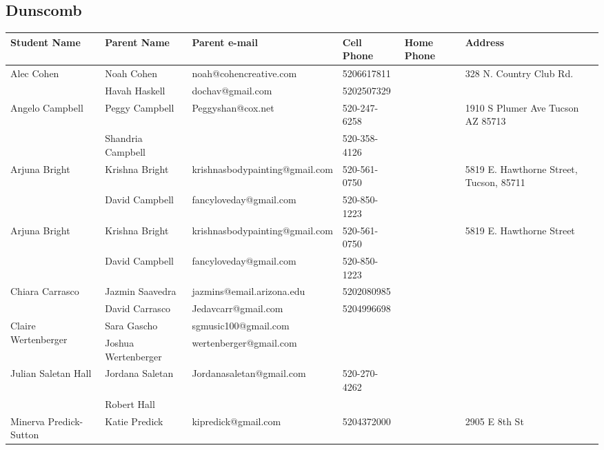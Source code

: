 \documentclass[landscape]{article}\usepackage[]{graphicx}\usepackage[]{color}
\begin{document}
\subsection{Dunscomb}
\begin{longtable}{|p{100pt}|p{100pt}|p{140pt}|p{60pt}|p{64pt}|p{120pt}|}
\textbf{Student Name} & \textbf{Parent Name} & \textbf{Parent e-mail} & \textbf{Cell Phone} & \textbf{Home Phone} & \textbf{Address}\\
\hline
\hline
\multirow{2}{100pt}{Alec Cohen} & Noah Cohen & noah@cohencreative.com & 5206617811 &  & \multirow{2}{120pt}{328 N. Country Club Rd.} \\
 & Havah Haskell & dochav@gmail.com & 5202507329 &  & \\
\hline
\multirow{2}{100pt}{Angelo Campbell } & Peggy Campbell  & Peggyshan@cox.net & 520-247-6258 &  & \multirow{2}{120pt}{1910 S Plumer Ave Tucson AZ 85713} \\
 & Shandria Campbell  &  & 520-358-4126 &  & \\
\hline
\multirow{2}{100pt}{Arjuna Bright} & Krishna Bright & krishnasbodypainting@gmail.com & 520-561-0750 &  & \multirow{2}{120pt}{5819 E. Hawthorne Street, Tucson, 85711} \\
 & David Campbell & fancyloveday@gmail.com & 520-850-1223 &  & \\
\hline
\multirow{2}{100pt}{Arjuna Bright} & Krishna Bright & krishnasbodypainting@gmail.com & 520-561-0750 &  & \multirow{2}{120pt}{5819 E. Hawthorne Street} \\
 & David Campbell & fancyloveday@gmail.com & 520-850-1223 &  & \\
\hline
\multirow{2}{100pt}{Chiara Carrasco} & Jazmin Saavedra & jazmins@email.arizona.edu & 5202080985 &  & \multirow{2}{120pt}{} \\
 & David Carrasco & Jedavcarr@gmail.com & 5204996698 &  & \\
\hline
\multirow{2}{100pt}{Claire Wertenberger} & Sara Gascho & sgmusic100@gmail.com &  &  & \multirow{2}{120pt}{} \\
 & Joshua Wertenberger & wertenberger@gmail.com &  &  & \\
\hline
\multirow{2}{100pt}{Julian Saletan Hall} & Jordana Saletan & Jordanasaletan@gmail.com & 520-270-4262 &  & \multirow{2}{120pt}{} \\
 & Robert Hall &  &  &  & \\
\hline
\multirow{2}{100pt}{Minerva Predick-Sutton} & Katie Predick & kipredick@gmail.com & 5204372000 &  & \multirow{2}{120pt}{2905 E 8th St} \\

\end{longtable}
\end{document}
